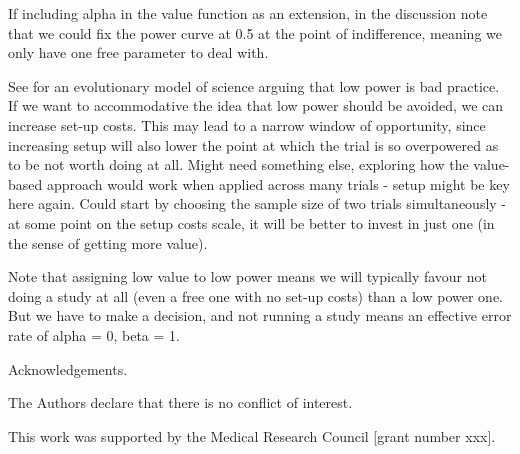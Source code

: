 \documentclass[sagev, Crown]{sagej}
\begin{document}
If including alpha in the value function as an extension, in the discussion note that we could fix the power curve at 0.5 at the point of indifference, meaning we only have one free parameter to deal with.

See \cite{Smaldino2016} for an evolutionary model of science arguing that low power is bad practice. If we want to accommodative the idea that low power should be avoided, we can increase set-up costs. This may lead to a narrow window of opportunity, since increasing setup will also lower the point at which the trial is so overpowered as to be not worth doing at all. Might need something else, exploring how the value-based approach would work when applied across many trials - setup might be key here again. Could start by choosing the sample size of two trials simultaneously - at some point on the setup costs scale, it will be better to invest in just one (in the sense of getting more value).

Note that assigning low value to low power means we will typically favour not doing a study at all (even a free one with no set-up costs) than a low power one. But we have to make a decision, and not running a study means an effective error rate of alpha = 0, beta = 1. 

\begin{acks}
Acknowledgements.
\end{acks}

\begin{dci}
The Authors declare that there is no conflict of interest.
\end{dci}

\begin{funding}
This work was supported by the Medical Research Council [grant number xxx].
\end{funding}



\end{document}
